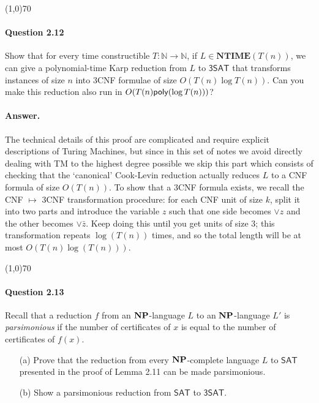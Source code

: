 \begin{center}
	\line(1,0){70}
\end{center}

\paragraph{Question 2.12} Show that for every time constructible $T:\mathbb{N}\rightarrow\mathbb{N}$, if $L\in\mathbf{NTIME}(T(n))$, we can give a polynomial-time Karp reduction from $L$ to $\mathsf{3SAT}$ that transforms instances of size $n$ into 3CNF formulae of size $O(T(n)\log T(n))$. Can you make this reduction also run in $O(T(n)\mathsf{poly}(\log T(n)))$?

\paragraph{Answer.} The technical details of this proof are complicated and require explicit descriptions of Turing Machines, but since in this set of notes we avoid directly dealing with TM to the highest degree possible we skip this part which consists of checking that the `canonical' Cook-Levin reduction actually reduces $L$ to a CNF formula of size $O(T(n))$. To show that a 3CNF formula exists, we recall the CNF $\mapsto$ 3CNF transformation procedure: for each CNF unit of size $k$, split it into two parts and introduce the variable $z$ such that one side becomes $\vee z$ and the other becomes $\vee \bar{z}$. Keep doing this until you get units of size $3$; this transformation repeats $\log(T(n))$ times, and so the total length will be at most $O(T(n)\log(T(n)))$.

\begin{center}
	\line(1,0){70}
\end{center}

\paragraph{Question 2.13} Recall that a reduction $f$ from an $\mathbf{NP}$-language $L$ to an $\mathbf{NP}$-language $L'$ is \textit{parsimonious} if the number of certificates of $x$ is equal to the number of certificates of $f(x)$.
\begin{enumerate}
	\item[(a)] Prove that the reduction from every $\mathbf{NP}$-complete language $L$ to $\mathsf{SAT}$ presented in the proof of Lemma 2.11 can be made parsimonious.
	\item[(b)] Show a parsimonious reduction from $\mathsf{SAT}$ to $\mathsf{3SAT}$.
\end{enumerate}

